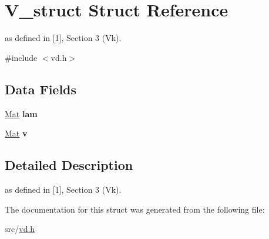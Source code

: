 \hypertarget{structV__struct}{}\section{V\+\_\+struct Struct Reference}
\label{structV__struct}


as defined in \mbox{[}1\mbox{]}, Section 3 (Vk).  




{\ttfamily \#include $<$vd.\+h$>$}

\subsection*{Data Fields}
\begin{DoxyCompactItemize}
\item 
\mbox{\label{structV__struct_a56d1655953ba5bee519bd62d992abfff}} 
\mbox{\hyperlink{typedefs_8cpp_a9fa28c1f74e909474857584f5c7b0088}{Mat}} {\bfseries lam}
\item 
\mbox{\label{structV__struct_aa78c83185af94c1df09f59a689881cd9}} 
\mbox{\hyperlink{typedefs_8cpp_a9fa28c1f74e909474857584f5c7b0088}{Mat}} {\bfseries v}
\end{DoxyCompactItemize}


\subsection{Detailed Description}
as defined in \mbox{[}1\mbox{]}, Section 3 (Vk). 

The documentation for this struct was generated from the following file\+:\begin{DoxyCompactItemize}
\item 
src/\mbox{\hyperlink{vd_8h}{vd.\+h}}\end{DoxyCompactItemize}
